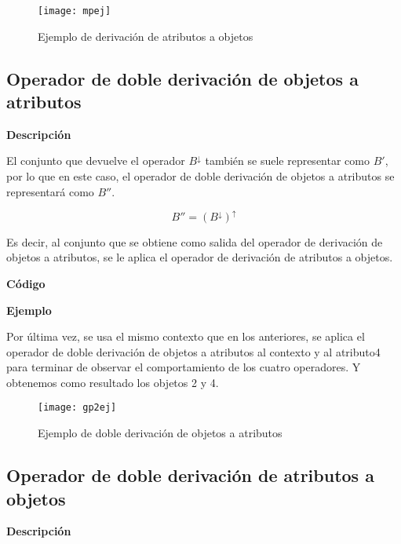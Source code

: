         \begin{figure}[H]
            \centering
            \texttt{[image: mpej]}
            \caption{Ejemplo de derivaci\'on de atributos a objetos}
            \label{fig:mpej}
        \end{figure}



    \subsection{Operador de doble derivaci\'on de objetos a atributos}

        \textbf{Descripci\'on}

        El conjunto que devuelve el operador \( B^\downarrow \) tambi\'en se suele representar como \( B' \), por lo que en este caso, 
        el operador de doble derivaci\'on de objetos a atributos se representar\'a como \( B'' \).


        \[ B'' = (B^\downarrow)^\uparrow \]

        Es decir, al conjunto que se obtiene como salida del operador de derivaci\'on de objetos a atributos, se le aplica el operador 
        de derivaci\'on de atributos a objetos.

        \bigskip

        \textbf{C\'odigo}

        

        \bigskip

        \textbf{Ejemplo}

        Por \'ultima vez, se usa el mismo contexto que en los anteriores, se aplica el operador de doble derivaci\'on de 
        objetos a atributos al contexto y al atributo4 para terminar de observar el comportamiento de los cuatro operadores. Y 
        obtenemos como resultado los objetos 2 y 4.

        \begin{figure}[H]
            \centering
            \texttt{[image: gp2ej]}
            \caption{Ejemplo de doble derivaci\'on de objetos a atributos}
            \label{fig:gp2ej}
        \end{figure}


    \subsection{Operador de doble derivaci\'on de atributos a objetos}

        \textbf{Descripci\'on}

